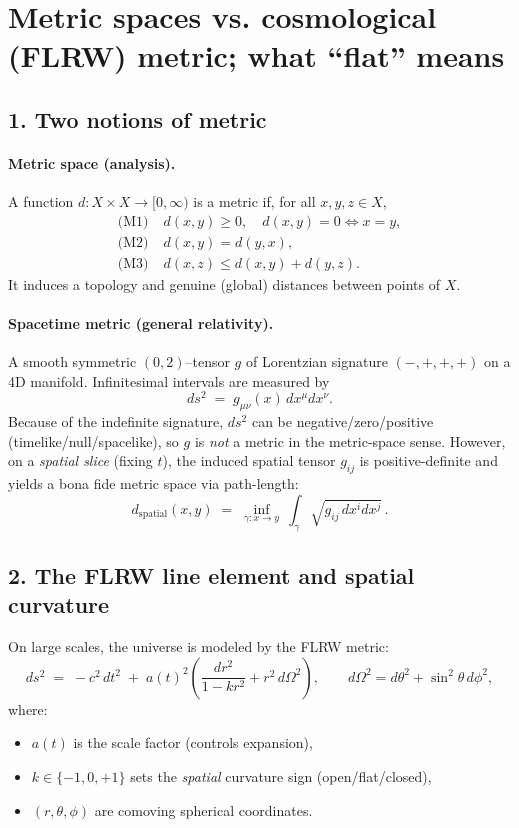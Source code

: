 \documentclass[12pt,a4paper]{article}
\begin{document}
\section*{Metric spaces vs. cosmological (FLRW) metric; what ``flat'' means}

\subsection*{1. Two notions of metric}
\paragraph{Metric space (analysis).}
A function $d:X\times X\to[0,\infty)$ is a metric if, for all $x,y,z\in X$,
\begin{align*}
\text{(M1)}\;& d(x,y)\ge 0,\quad d(x,y)=0 \iff x=y,\\
\text{(M2)}\;& d(x,y)=d(y,x),\\
\text{(M3)}\;& d(x,z)\le d(x,y)+d(y,z).
\end{align*}
It induces a topology and genuine (global) distances between points of $X$.

\paragraph{Spacetime metric (general relativity).}
A smooth symmetric $(0,2)$--tensor $g$ of Lorentzian signature $(-,+,+,+)$ on a 4D manifold.
Infinitesimal intervals are measured by
\[
ds^2 \;=\; g_{\mu\nu}(x)\,dx^\mu dx^\nu.
\]
Because of the indefinite signature, $ds^2$ can be negative/zero/positive (timelike/null/spacelike),
so $g$ is \emph{not} a metric in the metric-space sense. However, on a \emph{spatial slice} (fixing $t$),
the induced spatial tensor $g_{ij}$ is positive-definite and yields a bona fide metric space via path-length:
\[
d_{\text{spatial}}(x,y) \;=\; \inf_{\gamma:x\to y}\ \int_\gamma \sqrt{g_{ij}\,dx^i dx^j}\,.
\]

\subsection*{2. The FLRW line element and spatial curvature}
On large scales, the universe is modeled by the FLRW metric:
\[
ds^2 \;=\; -c^2\,dt^2 \;+\; a(t)^2\!\left(\frac{dr^2}{1-k r^2} + r^2\,d\Omega^2\right),
\qquad d\Omega^2 = d\theta^2 + \sin^2\!\theta\,d\phi^2,
\]
where:
\begin{itemize}
\item $a(t)$ is the scale factor (controls expansion),
\item $k\in\{-1,0,+1\}$ sets the \emph{spatial} curvature sign (open/flat/closed),
\item $(r,\theta,\phi)$ are comoving spherical coordinates.
\end{itemize}
\end{document}
